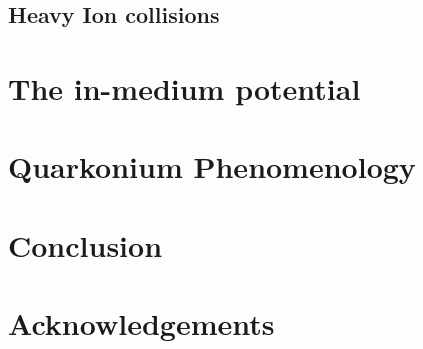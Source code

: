 \documentclass[12pt, a4paper, twoside]{book}
\begin{document}
\section{Heavy Ion collisions}
\label{sec:quark_HIC}
\onehalfspacing
\chapter{The in-medium potential}
\label{sec:med_pot}
\onehalfspacing
\chapter{Quarkonium Phenomenology}
\label{sec:quark_pheno}
\onehalfspacing
\chapter{Conclusion}
\label{sec:conc}
\onehalfspacing




\chapter*{Acknowledgements}


\cleardoublepage

\end{document}

